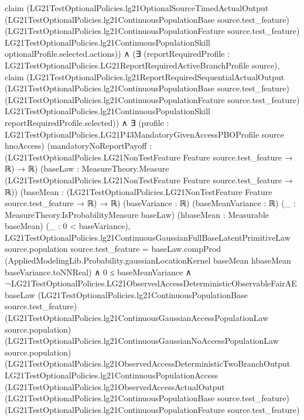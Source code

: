 \documentclass[10pt]{article}
\begin{document}
\begin{ReviewVerbatim}
        claim
          (LG21TestOptionalPolicies.lg21OptionalSourceTimedActualOutput
            (LG21TestOptionalPolicies.lg21ContinuousPopulationBase source.test_feature)
            (LG21TestOptionalPolicies.lg21ContinuousPopulationFeature source.test_feature)
            LG21TestOptionalPolicies.lg21ContinuousPopulationSkill optionalProfile.selected.actions)) ∧
      (∃ (reportRequiredProfile : LG21TestOptionalPolicies.LG21ReportRequiredActiveBranchProfile source),
          claim
            (LG21TestOptionalPolicies.lg21ReportRequiredSequentialActualOutput
              (LG21TestOptionalPolicies.lg21ContinuousPopulationBase source.test_feature)
              (LG21TestOptionalPolicies.lg21ContinuousPopulationFeature source.test_feature)
              LG21TestOptionalPolicies.lg21ContinuousPopulationSkill reportRequiredProfile.selected)) ∧
        ∃ (profile : LG21TestOptionalPolicies.LG21P43MandatoryGivenAccessPBOProfile source hnoAccess)
          (mandatoryNoReportPayoff : (LG21TestOptionalPolicies.LG21NonTestFeature Feature source.test_feature → ℝ) → ℝ)
          (baseLaw :
          MeasureTheory.Measure (LG21TestOptionalPolicies.LG21NonTestFeature Feature source.test_feature → ℝ)) (baseMean
          : (LG21TestOptionalPolicies.LG21NonTestFeature Feature source.test_feature → ℝ) → ℝ) (baseVariance : ℝ)
          (baseMeanVariance : ℝ) (_ : MeasureTheory.IsProbabilityMeasure baseLaw) (hbaseMean : Measurable baseMean) (_ :
          0 < baseVariance),
          LG21TestOptionalPolicies.lg21ContinuousGaussianFullBaseLatentPrimitiveLaw source.population
                source.test_feature =
              baseLaw.compProd
                (AppliedModelingLib.Probability.gaussianLocationKernel baseMean hbaseMean baseVariance.toNNReal) ∧
            0 ≤ baseMeanVariance ∧
              ¬LG21TestOptionalPolicies.LG21ObservedAccessDeterministicObservableFairAE baseLaw
                    (LG21TestOptionalPolicies.lg21ContinuousPopulationBase source.test_feature)
                    (LG21TestOptionalPolicies.lg21ContinuousGaussianAccessPopulationLaw source.population)
                    (LG21TestOptionalPolicies.lg21ContinuousGaussianNoAccessPopulationLaw source.population)
                    (LG21TestOptionalPolicies.lg21ObservedAccessDeterministicTwoBranchOutput
                      LG21TestOptionalPolicies.lg21ContinuousPopulationAccess
                      (LG21TestOptionalPolicies.lg21ObservedAccessActualOutput
                        (LG21TestOptionalPolicies.lg21ContinuousPopulationBase source.test_feature)
                        (LG21TestOptionalPolicies.lg21ContinuousPopulationFeature source.test_feature)

\end{ReviewVerbatim}
\end{document}
